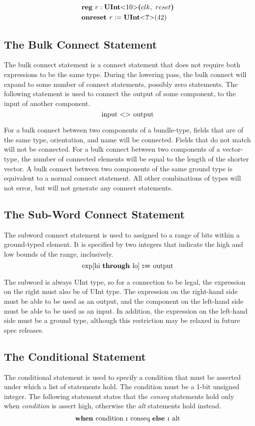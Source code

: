 \documentclass[12pt]{article}
\begin{document}
\[
\begin{aligned}
& \kw{reg} r : \kws{UInt}\kws{$<$} 10 \kws{$>$} \kws{(} clk, \ reset \kws{)}\\
& \kw{onreset} r := \kws{UInt}\kws{$<$} \kws{?} \kws{$>$}(42)
\end{aligned}
\]

\subsection{The Bulk Connect Statement}
The bulk connect statement is a connect statement that does not require both expressions to be the same type. 
During the lowering pass, the bulk connect will expand to some number of connect statements, possibly zero statements.
The following statement is used to connect the output of some component, to the input of another component. 
\[
\text{input } \text{\bf $<>$\ } \text{output} 
\]

For a bulk connect between two components of a bundle-type, fields that are of the same type, orientation, and name will be connected.
Fields that do not match will not be connected.
For a bulk connect between two components of a vector-type, the number of connected elements will be equal to the length of the shorter vector.
A bulk connect between two components of the same ground type is equivalent to a normal connect statement.
All other combinations of types will not error, but will not generate any connect statements.

\subsection{The Sub-Word Connect Statement}
The subword connect statement is used to assigned to a range of bits within a ground-typed element. It is specified by two integers that indicate the high and low bounds of the range, inclusively.
\[
\text{exp}[\text{hi } \kw{through} \text{lo}] \ \kw{:=} \text{output} 
\]

The subword is always UInt type, so for a connection to be legal, the expression on the right must also be of UInt type.
The expression on the right-hand side must be able to be used as an output, and the component on the left-hand side must be able to be used as an input.
In addition, the expression on the left-hand side must be a ground type, although this restriction may be relaxed in future spec releases.

\subsection{The Conditional Statement}
The conditional statement is used to specify a condition that must be asserted under which a list of statements hold.
The condition must be a 1-bit unsigned integer.
The following statement states that the {\em conseq} statements hold only when {\em condition} is assert high, otherwise the {\em alt} statements hold instead.
\[
\begin{aligned}
\text{\bf when\ } \text{condition } \text{\bf :\ } \text{conseq } \text{\bf else :\ } \text{alt}
\end{aligned}
\]
\end{document}
